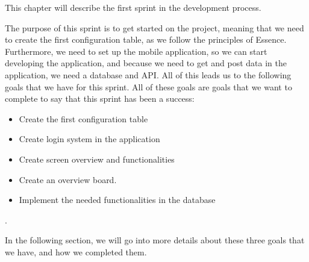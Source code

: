 This chapter will describe the first sprint in the development process.

The purpose of this sprint is to get started on the project, meaning that we need to create the first configuration table, as we follow the principles of Essence.
Furthermore, we need to set up the mobile application, so we can start developing the application, and because we need to get and post data in the application, we need a database and API.
All of this leads us to the following goals that we have for this sprint.
All of these goals are goals that we want to complete to say that this sprint has been a success:

\begin{itemize}
    \item Create the first configuration table 
    \item Create login system in the application
    \item Create screen overview and functionalities
    \item Create an overview board.
    \item Implement the needed functionalities in the database
\end{itemize}.

In the following section, we will go into more details about these three goals that we have, and how we completed them.
